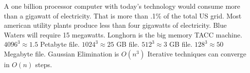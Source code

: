 \documentclass{article}
\begin{document}
A one billion processor computer with today's technology would consume more than a gigawatt of electricity. 
That is more than .1\% of the total US grid.
Most american utility plants produce less than four gigawatts of electricity.
\newline
\newline
Blue Waters will require 15 megawatts.
\newline
\newline
Longhorn is the big memory TACC machine.
\newline
\newline
$4096^3 \approx 1.5$ Petabyte file.
$1024^3 \approx 25$ GB file.
$512^3 \approx   3$ GB file.
$128^3 \approx  50$ Megabyte file.
\newline
\newline
Gaussian Elimination is $O(n^3)$
\newline
\newline
Iterative techniques can converge in $O(n)$ steps.

%
%
\newpage
\end{document}
